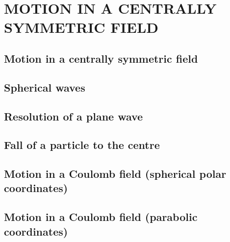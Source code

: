 \chapter{MOTION IN A CENTRALLY SYMMETRIC FIELD}\label{MOTION IN A CENTRALLY SYMMETRIC FIELD}
\section{Motion in a centrally symmetric field}\label{Motion in a centrally symmetric field}
\section{Spherical waves}\label{Spherical waves}
\section{Resolution of a plane wave}\label{Resolution of a plane wave}
\section{Fall of a particle to the centre}\label{Fall of a particle to the centre}
\section{Motion in a Coulomb field (spherical polar coordinates)}\label{Motion in a Coulomb field (spherical polar coordinates)}
\section{Motion in a Coulomb field (parabolic coordinates)}\label{Motion in a Coulomb field (parabolic coordinates)}